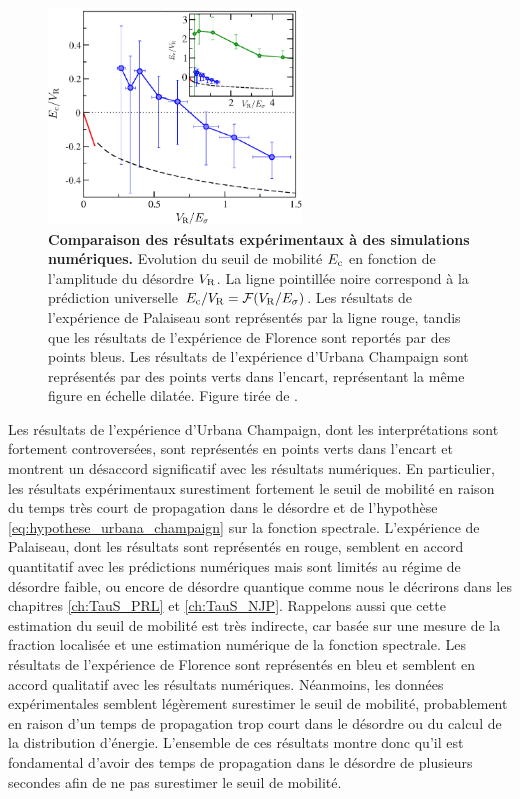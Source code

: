 \begin{figure}
\centering
\includegraphics[width=0.6\textwidth]{Fig/Localisation/delande_expvsth.pdf}
\caption{\textbf{Comparaison des résultats expérimentaux à des simulations numériques.} Evolution du seuil de mobilité $E_{\mathrm{c}}$ en fonction de l'amplitude du désordre $V_{\mathrm{R}}$. La ligne pointillée noire correspond à la prédiction universelle $E_{\mathrm{c}}/V_{\mathrm{R}}=\mathcal{F}(V_{\mathrm{R}}/E_{\sigma})$. Les résultats de l'expérience de Palaiseau sont représentés par la ligne rouge, tandis que les résultats de l'expérience de Florence sont reportés par des points bleus. Les résultats de l'expérience d'Urbana Champaign sont représentés par des points verts dans l'encart, représentant la même figure en échelle dilatée. Figure tirée de \citep{pasek2017anderson}.}
\label{fig:seuil_mobilite_delande}
\end{figure}

Les résultats de l'expérience d'Urbana Champaign, dont les interprétations sont fortement controversées, sont représentés en points verts dans l'encart et montrent un désaccord significatif avec les résultats numériques. En particulier, les résultats expérimentaux surestiment fortement le seuil de mobilité en raison du temps très court de propagation dans le désordre et de l'hypothèse \ref{eq:hypothese_urbana_champaign} sur la fonction spectrale. L'expérience de Palaiseau, dont les résultats sont représentés en rouge, semblent en accord quantitatif avec les prédictions numériques mais sont limités au régime de désordre faible, ou encore de désordre quantique comme nous le décrirons dans les chapitres \ref{ch:TauS_PRL} et \ref{ch:TauS_NJP}. Rappelons aussi que cette estimation du seuil de mobilité est très indirecte, car basée sur une mesure de la fraction localisée et une estimation numérique de la fonction spectrale. Les résultats de l'expérience de Florence sont représentés en bleu et semblent en accord qualitatif avec les résultats numériques. Néanmoins, les données expérimentales semblent légèrement surestimer le seuil de mobilité, probablement en raison d'un temps de propagation trop court dans le désordre ou du calcul de la distribution d'énergie. L'ensemble de ces résultats montre donc qu'il est fondamental d'avoir des temps de propagation dans le désordre de plusieurs secondes afin de ne pas surestimer le seuil de mobilité.




